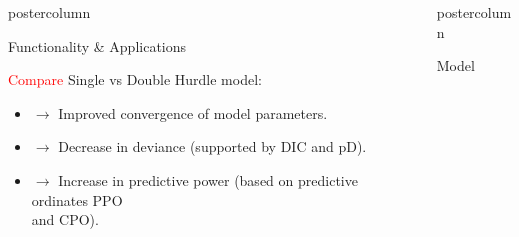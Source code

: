 \documentclass[final]{beamer}\usepackage[]{graphicx}\usepackage[]{color}
\newcommand{\red}{\textcolor{red}}
\newlength{\columnheight}\setlength{\columnheight}{75cm} %
\begin{document}
{\begin{frame}
\begin{columns}
\begin{column}{.33\textwidth}
\begin{beamercolorbox}[center,wd=\textwidth]{postercolumn}
\begin{minipage}[T]{.97\textwidth}
{\begin{block}{Functionality \& Applications}
\vspace{1.2cm}

\begin{minipage}[t][0.1mm]{.97\textwidth}
	
	\red{Compare} Single vs Double Hurdle model:
	\begin{itemize}
		\item[]  $\rightarrow$ Improved convergence of model parameters.
		\item[]  $\rightarrow$ Decrease in deviance (supported by DIC and pD).
		\item[]  $\rightarrow$ Increase in predictive power (based on predictive ordinates PPO\\  \hspace{11mm} and CPO).
	\end{itemize}
	
\end{minipage}

\vspace{7.95cm}





\end{block}
\vfill
}
\end{minipage}
\end{beamercolorbox}
\end{column}
\begin{column}{.33\textwidth}
\begin{beamercolorbox}[center,wd=\textwidth]{postercolumn}
\begin{minipage}[T]{.97\textwidth}  %
\parbox[t][\columnheight]{\textwidth}{ %



\begin{block}{Model}
	

\end{block}}
\end{minipage}
\end{beamercolorbox}
\end{column}
\end{columns}
\end{frame}}
\end{document}
